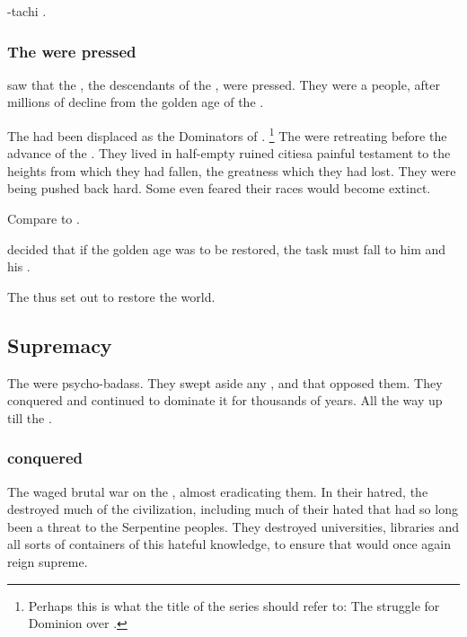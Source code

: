 \Nexagglachel-tachi . 





\subsubsection{The \ophidians were pressed}
\Nexagglachel saw that the \quiljaaran, the descendants of the \ophidians, were pressed. 
They were a  people, after millions of decline from the golden age of the . 

The \ophidians had been displaced as the Dominators of \Miith{}.%
\footnote{%
  Perhaps this is what the title of the series should refer to: 
  The struggle for Dominion over \Miith{}.%
} 
The \quiljaaran were retreating before the advance of the \aryothim.
They lived in half-empty ruined cities\dash a painful testament to the heights from which they had fallen, the greatness which they had lost. 
They were being pushed back hard. 
Some even feared their races would become extinct. 

Compare to . 

\Nexagglachel decided that if the \ophidian golden age was to be restored, the task must fall to him and his \dragons. 

The \dragons thus set out to restore the world. 









\subsection{\Draconian Supremacy}
The \dragons were psycho-badass. 
They swept aside any \quiljaaran, \aryothim and \vorcanths that opposed them. 
They conquered \Miith and continued to dominate it for thousands of years. 
All the way up till the \secondbanewar. 





\subsubsection{\Aryothim conquered}
The \dragons waged brutal war on the \aryothim, almost eradicating them. 
In their hatred, the \dragons destroyed much of the \aryoth civilization, including much of their hated  that had so long been a threat to the Serpentine peoples.
They destroyed universities, libraries and all sorts of containers of this hateful \aryoth knowledge, to ensure that \dragons would once again reign supreme. 

